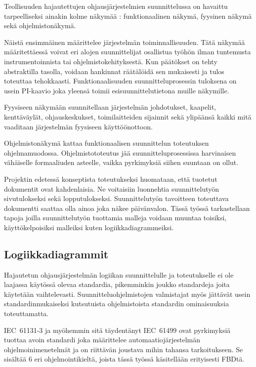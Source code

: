 \documentclass[finnish,12pt]{article}
\begin{document}
Teollisuuden hajautettujen ohjausjärjestelmien suunnittelussa on havaittu
tarpeelliseksi ainakin kolme näkymää \cite{RefWorks:38}: funktionaalinen näkymä,
fyysinen näkymä sekä ohjelmistonäkymä.

Näistä ensimmäinen määrittelee järjestelmän toiminnallisuuden. Tätä näkymää
määritettäessä voivat eri alojen suunnittelijat osallistua työhön ilman
tuntemusta instrumentoinnista tai ohjelmistokehityksestä. Kun päätökset on tehty
abstraktilla tasolla, voidaan hankinnat räätälöidä sen mukaisesti ja tulos
toteuttaa tehokkaasti. Funktionaalisuuden suunnitteluprosessin tuloksena on usein
PI-kaavio joka yleensä toimii esisuunnittelutietona muille näkymille.

Fyysiseen näkymään suunnitellaan järjestelmän johdotukset, kaapelit, kenttäväylät,
ohjauskeskukset, toimilaitteiden sijainnit sekä ylipäänsä kaikki mitä vaaditaan järjestelmän fyysiseen käyttöönottoon.

Ohjelmistonäkymä kattaa funktionaalisen suunnittelun toteutuksen ohjelmamuodossa.
Ohjelmistototeutus jää suunnitteluprosessissa harvinaisen vähäiselle formaaliuden asteelle, vaikka pyrkimyksiä siihen suuntaan on ollut.

Projektin edetessä konseptista toteutukseksi huomataan, että tuotetut dokumentit ovat kahdenlaisia.
Ne voitaisiin luonnehtia suunnittelutyön sivutulokseksi sekä lopputulokseksi.
Suunnittelutyön tavoitteen toteuttava dokumentti saattaa olla ainoa joka näkee päivänvalon.
Tässä työssä tarkastellaan tapoja joilla suunnittelutyön tuottamia malleja voidaan muuntaa
toisiksi, käyttökelpoisiksi malleiksi kuten logiikkadiagrammeiksi.

	\subsection{Logiikkadiagrammit}

Hajautetun ohjausjärjestelmän logiikan suunnittelulle ja toteutukselle ei ole
laajassa käytössä olevaa standardia, pikemminkin joukko standardeja joita
käytetään vaihtelevasti. Suunnitteluohjelmistojen valmistajat myös jättävät usein
standardinmukaiseksi kutsutuista ohjelmistoista standardin ominaisuuksia toteuttamatta.\cite{RefWorks:42}

IEC~61131-3 ja myöhemmin sitä täydentänyt IEC~61499 ovat pyrkimyksiä tuottaa
avoin standardi joka määrittelee automaatiojärjestelmän ohjelmoinimenetelmät ja
on riittävän joustava mihin tahansa tarkoitukseen. Se sisältää 6 eri
ohjelmointikieltä, joista tässä työssä käsitellään erityisesti FBDtä.
\end{document}
